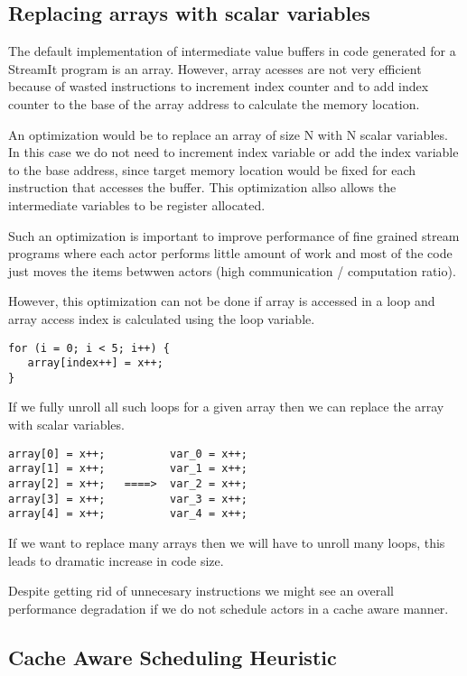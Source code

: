 \documentclass{sig-alternate}
\begin{document}
\subsection{Replacing arrays with scalar variables}

The default implementation of intermediate value buffers
in code generated for a StreamIt program is an array.
However, array acesses are not very efficient because 
of wasted instructions to increment index counter and 
to add index counter to the base of the array address 
to calculate the memory location.

An optimization would be to replace an array of size N with 
N scalar variables. In this case we do not need to increment 
index variable or add the index variable to the base address, 
since target memory location would be fixed for each
instruction that accesses the buffer. This optimization
allso allows the intermediate variables to be
register allocated.

Such an optimization is important to improve 
performance of fine grained stream programs where each actor
performs little amount of work and most of the code just moves 
the items betwwen actors (high communication / computation ratio).

However, this optimization can not be done if array is accessed in a loop 
and array access index is calculated using the loop variable.

\begin{verbatim}
for (i = 0; i < 5; i++) {
   array[index++] = x++;
}
\end{verbatim}

If we fully unroll all such loops for a given array then we 
can replace the array with scalar variables.

\begin{verbatim}
array[0] = x++;          var_0 = x++;
array[1] = x++;          var_1 = x++;
array[2] = x++;   ====>  var_2 = x++;
array[3] = x++;          var_3 = x++;
array[4] = x++;          var_4 = x++;
\end{verbatim}

If we want to replace many arrays then we will have to unroll
many loops, this leads to dramatic increase in code size.

Despite getting rid of unnecesary instructions we might see
an overall performance degradation if we do not schedule
actors in a cache aware manner.


\subsection{Cache Aware Scheduling Heuristic}
\end{document}
